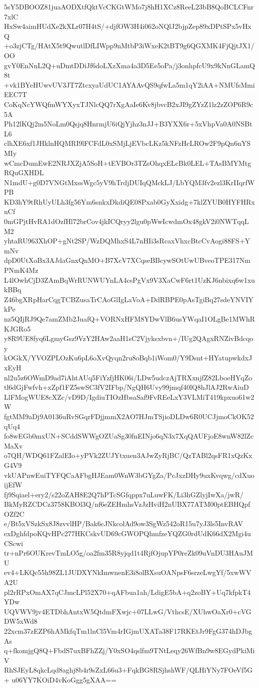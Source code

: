 5sY5DBOOZ81juaAODXtfQktVcCKGtWMo7j8hH1XCz8ReeL23bB8QoBCLCFnr7xlC
HxSw4aimHUdXe2kXLr07H4tS/+djfOW3H4i062oNQlJ2bjpZep89xDPtSPx5vHxQ
+o3zjCTg/HAtX5t9QwutlDfLIWpp9nMtbP3iWxeK2tBT9g6QGXMK4FjQjtJX1/OO
gvY0EnNnL2Q+uDmtDDiJf6doLXzXma4a3D5Ee5oPa/j3onhpfcU9x9kNnGLamQ8t
+vk1BYeHUwvUV3JT7ZtcxyaUdUC1AYAAvQS9qfwLa5m1qY2iAA+NMUfsMmiEEC7T
CoKqNcYWQfmWYXyxTJNlcQQ7rXgAaIe6Kv8jbvcB2xJI9gZYzZ1lz2zZOP6R9c5A
Ph12lKQj2m5NoLm0Qsjq8HnrmjU6iQjYjhz3nJJ+B3YXX6r+5xVhpVa0A0NSBtL6
clhXE6xf1JHklnHQMRI9lFCFdL0xSMjLjEVbcLKz5kNFzHcLROw2F9pQn6nYSMIy
wCmcDumEwE2NRJXZjA5SoH+tEVBOr3TZsOhqxELcBk0LEL+TAsBMYMtgRQuGXHDL
N1mdU+g0D7VNGtMxssWgc5yV9hTrdjDUIqQMckLJ/LbYQM3fv2ezl3KrIIqrfWPB
KD3hY9tRhUyULh3fg56Ym6snkxDkdiQE08Pxab0GyXxidg+7klZYUB0HYFHRxnCf
0mGPjtHvRA1dOzfHl72brCov4jkICQryy2lgu0pWwIcwdmOx48gkV2i0NWTqqLM2
yhtaRU963XhOP+gNt2SP/WzDQMhxS4L7nHIi3sRcaxVhxcBtcCvAogi88FS+YmNv
dpD0UtXoBx3AJdaGnxQnMO+B7XcV7XCqseBBcywSOtUwUBveoTPE317NmPNmK4Mz
L4lOwhCjD3ZAmBqWrRUNWUYnLA4csPgVx9V3XaCwF6rt1UzKJ6nbixq6w1xukBBq
Z46bgXRpHarCqgTCBZusaTrCAoGlIgLaVoA+DdRBPE0pAsTgiBq27sdeYNVIYkPe
nz5QIjRJ9Qe7amZMb2JuafQ+VORNxHFM8YDwVlB6usYWqaI1OLgBe1MWhRKJGRo5
y8R9UE8fyq6LgmyGsz9VzY2HAw2aaH1sC2Vjyksxbvn+/IUg2QAgxRNZivBdcqoy
kOGkX/YVOZPLOzKu6pL6oXvQyqn2ru8oBqb1iWom0/Y9Dsnt+HYatupwkdxJxEyH
nl2u5z6OWmD9ad7iAhtAUq5FiYzfjHK06i/LDw5udczAjTRXxnjfZ82LboeHYqZo
tl6dGjFwfvh+xZpf1FZ5swSC3fV2IFbp/NgQH6Uvy99jmqf40lQ8hJlAJ2RwAiuD
LlFMogWUE8cXZc/vD9D/IgdiuTIOzHbsaSaf9FvREeLxY3VLMiT419kpxuo61w2W
fgtMM9aDj9A0136uRvSGqrFDjjmmX2AO7HJmTSjioDLDw6R0UCJjmoCkOK52qUq4
fo8wEGb0mxUN+SCddSWWgOZUaSg30fnEINjo6qN3x7XqQAUFjoE8wnW82lZcMaXv
o7QH/WDQ61FZalEIo+yPVk2ZUJYtxuen3AJwZyRjBC/QzTABl2qsFR1xQzKxG4V9
vkUAPnwEuiTYFQCaAFbgHJEam0WnW3bGYgZa/PcJxzDHy9uxKvqwg/cdXuoijEfW
fj9Sqiael+ery2/s22oZAH8E2Q7hPTcSGfqppx7uLuwFK/Li3hGZlyjIwXa/jwR/
BkMyRZCDCz3758KBOl3Q/nf6eZEHmhsVzJzHviH2nUBX77ATM00ptEBHQpfOZf2C
e/Bt5xVSzkSx8J8zvvlHP/Bak6cJNkcolAd9ow3SgWz542oR15u7yJ3ls5InvRAV
exDghfdpoKQvHPc277HKCskvUD69cGWOPQhmfzeYQZG0rdUdK66dX2Mgi4uCScwi
tr+nPr6OUKrevTmLO5g/oa2fm35R8yjqd1t4RjfOjupYP0reZk09uVnDU3HAuJMU
ev4+LKQc55h98ZL1JUDXYNkImwnenE3i8olBXsuOANpsF6srzeLwgYf/5xwWVA2U
pl2rRPxOmAX7qCJmcLPl52X70+qAFbua1ah/LdigE5bA+q2zoBY+Uq7kfpkT4YDw
UQVWV9jv4ETDbhAntxW5QtdmFXwjc+07LLwG/VthcsE/XUhwOaXr0+cVGDW5xWd8
22xcm37zEZP6hAMkfqTm1lnCl5Vm4rIGjmUXATa38F17RKEtJr9FgG374hDJbgAs
q+fkomjgQ8Q+FbdS7uxBFhZZj/Y0xSO4qslfm9TNtLeqy26WfBn9w8EGydPkiMiV
RhSJEyL8qkcLqd8aghj8b4r9sZxL66u3+FqkBG8RSjhshWF/QLHiYNy7FOeVf5G+
u06YY7KOiD4vKoGgg5gXAA==
